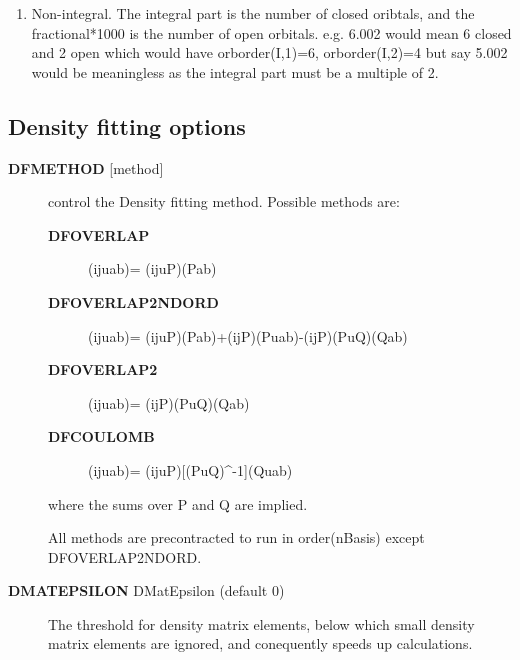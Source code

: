 \documentclass[openany,a4paper,10pt,english]{manual}
\begin{document}
\begin{description}
\begin{enumerate}
\item {} 
Non-integral.  The integral part is the number of closed oribtals,
and the fractional*1000 is the number of open orbitals.
e.g. 6.002 would mean 6 closed and 2 open
which would have orborder(I,1)=6, orborder(I,2)=4
but say 5.002 would be meaningless as the integral part must be a
multiple of 2.

\end{enumerate}

\end{description}


\subsection{Density fitting options}
\begin{description}
\item[\textbf{DFMETHOD} {[}method{]}] \leavevmode
control the Density fitting method.
Possible methods are:
\begin{description}
\item[\textbf{DFOVERLAP}] \leavevmode
(ij\textbar{}u\textbar{}ab)= (ij\textbar{}u\textbar{}P)(P\textbar{}ab)

\item[\textbf{DFOVERLAP2NDORD}] \leavevmode
(ij\textbar{}u\textbar{}ab)= (ij\textbar{}u\textbar{}P)(P\textbar{}ab)+(ij\textbar{}P)(P\textbar{}u\textbar{}ab)-(ij\textbar{}P)(P\textbar{}u\textbar{}Q)(Q\textbar{}ab)

\item[\textbf{DFOVERLAP2}] \leavevmode
(ij\textbar{}u\textbar{}ab)= (ij\textbar{}P)(P\textbar{}u\textbar{}Q)(Q\textbar{}ab)

\item[\textbf{DFCOULOMB}] \leavevmode
(ij\textbar{}u\textbar{}ab)= (ij\textbar{}u\textbar{}P){[}(P\textbar{}u\textbar{}Q)\textasciicircum{}-1{]}(Q\textbar{}u\textbar{}ab)

\end{description}

where the sums over P and Q are implied.

All methods are precontracted to run in order(nBasis) except
DFOVERLAP2NDORD.

\item[\textbf{DMATEPSILON} DMatEpsilon (default 0)] \leavevmode
The threshold for density matrix elements, below which small density
matrix elements are ignored, and conequently speeds up calculations.

\end{description}
\end{document}
